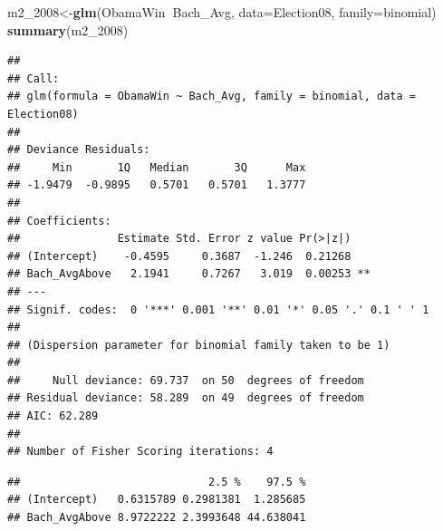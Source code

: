 \documentclass[]{article}
\newenvironment{Shaded}{\begin{snugshade}}{\end{snugshade}}
\newcommand{\CommentTok}[1]{\textcolor[rgb]{0.56,0.35,0.01}{\textit{#1}}}
\newcommand{\DataTypeTok}[1]{\textcolor[rgb]{0.13,0.29,0.53}{#1}}
\newcommand{\DecValTok}[1]{\textcolor[rgb]{0.00,0.00,0.81}{#1}}
\newcommand{\KeywordTok}[1]{\textcolor[rgb]{0.13,0.29,0.53}{\textbf{#1}}}
\newcommand{\NormalTok}[1]{#1}
\newcommand{\OperatorTok}[1]{\textcolor[rgb]{0.81,0.36,0.00}{\textbf{#1}}}
\begin{document}
\begin{Shaded}
\begin{Highlighting}[]
\NormalTok{m2_}\DecValTok{2008}\NormalTok{<-}\KeywordTok{glm}\NormalTok{(ObamaWin}\OperatorTok{~}\NormalTok{Bach_Avg, }\DataTypeTok{data=}\NormalTok{Election08, }\DataTypeTok{family=}\NormalTok{binomial)}
\KeywordTok{summary}\NormalTok{(m2_}\DecValTok{2008}\NormalTok{)}
\end{Highlighting}
\end{Shaded}

\begin{verbatim}
## 
## Call:
## glm(formula = ObamaWin ~ Bach_Avg, family = binomial, data = Election08)
## 
## Deviance Residuals: 
##     Min       1Q   Median       3Q      Max  
## -1.9479  -0.9895   0.5701   0.5701   1.3777  
## 
## Coefficients:
##               Estimate Std. Error z value Pr(>|z|)   
## (Intercept)    -0.4595     0.3687  -1.246  0.21268   
## Bach_AvgAbove   2.1941     0.7267   3.019  0.00253 **
## ---
## Signif. codes:  0 '***' 0.001 '**' 0.01 '*' 0.05 '.' 0.1 ' ' 1
## 
## (Dispersion parameter for binomial family taken to be 1)
## 
##     Null deviance: 69.737  on 50  degrees of freedom
## Residual deviance: 58.289  on 49  degrees of freedom
## AIC: 62.289
## 
## Number of Fisher Scoring iterations: 4
\end{verbatim}

\begin{Shaded}
\end{Shaded}

\begin{verbatim}
##                             2.5 %    97.5 %
## (Intercept)   0.6315789 0.2981381  1.285685
## Bach_AvgAbove 8.9722222 2.3993648 44.638041
\end{verbatim}
\end{document}
